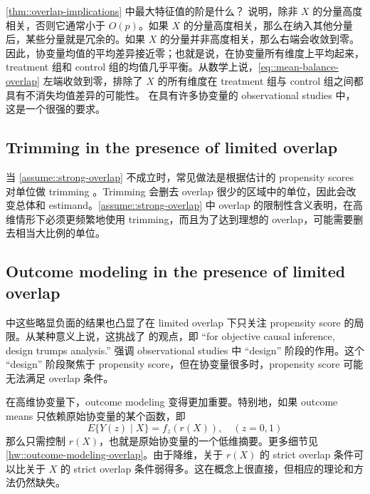 \cref{thm::overlap-implications} 中最大特征值的阶是什么？\citet{d2017overlap} 说明，除非 $X$ 的分量高度相关，否则它通常小于 $O(p)$。如果 $X$ 的分量高度相关，那么在纳入其他分量后，某些分量就是冗余的。如果 $X$ 的分量并非高度相关，那么右端会收敛到零。因此，协变量均值的平均差异接近零；也就是说，在协变量所有维度上平均起来，treatment 组和 control 组的均值几乎平衡。从数学上说，\cref{eq::mean-balance-overlap} 左端收敛到零，排除了 $X$ 的所有维度在 treatment 组与 control 组之间都具有不消失均值差异的可能性。
在具有许多协变量的 observational studies 中，这是一个很强的要求。



\subsection{Trimming in the presence of limited overlap}\label{sec::trimming-overlap}

当 \cref{assume::strong-overlap} 不成立时，常见做法是根据估计的 propensity scores 对单位做 trimming \citep{crump2009dealing, yang2018asymptotic}。Trimming 会删去 overlap 很少的区域中的单位，因此会改变总体和 estimand。\cref{assume::strong-overlap} 中 overlap 的限制性含义表明，在高维情形下必须更频繁地使用 trimming，而且为了达到理想的 overlap，可能需要删去相当大比例的单位。


\subsection{Outcome modeling in the presence of limited overlap}\label{sec::outcome-modeling-overlap}


\citet{d2017overlap} 中这些略显负面的结果也凸显了在 limited overlap 下只关注 propensity score 的局限。从某种意义上说，这挑战了 \citet{rubin2008objective} 的观点，即 ``for objective causal inference, design trumps analysis.'' \citet{rubin2008objective} 强调 observational studies 中 ``design'' 阶段的作用。这个 ``design'' 阶段聚焦于 propensity score，但在协变量很多时，propensity score 可能无法满足 overlap 条件。



在高维协变量下，outcome modeling 变得更加重要。特别地，如果 outcome means 只依赖原始协变量的某个函数，即
$$
E\{  Y(z) \mid X \} = f_z( r(X)   ),\quad (z=0,1)
$$
那么只需控制 $r(X)$，也就是原始协变量的一个低维摘要。更多细节见 \cref{hw::outcome-modeling-overlap}。由于降维，关于 $r(X)$ 的 strict overlap 条件可以比关于 $X$ 的 strict overlap 条件弱得多。这在概念上很直接，但相应的理论和方法仍然缺失。



